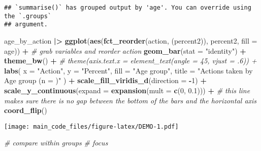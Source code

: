 \documentclass[
]{article}
\newenvironment{Shaded}{\begin{snugshade}}{\end{snugshade}}
\newcommand{\AttributeTok}[1]{\textcolor[rgb]{0.13,0.29,0.53}{#1}}
\newcommand{\CommentTok}[1]{\textcolor[rgb]{0.56,0.35,0.01}{\textit{#1}}}
\newcommand{\DecValTok}[1]{\textcolor[rgb]{0.00,0.00,0.81}{#1}}
\newcommand{\FloatTok}[1]{\textcolor[rgb]{0.00,0.00,0.81}{#1}}
\newcommand{\FunctionTok}[1]{\textcolor[rgb]{0.13,0.29,0.53}{\textbf{#1}}}
\newcommand{\NormalTok}[1]{#1}
\newcommand{\SpecialCharTok}[1]{\textcolor[rgb]{0.81,0.36,0.00}{\textbf{#1}}}
\newcommand{\StringTok}[1]{\textcolor[rgb]{0.31,0.60,0.02}{#1}}
\begin{document}
\begin{verbatim}
## `summarise()` has grouped output by 'age'. You can override using the `.groups`
## argument.
\end{verbatim}

\begin{Shaded}
\begin{Highlighting}[]
\NormalTok{age\_by\_action }\SpecialCharTok{|\textgreater{}}
  \FunctionTok{ggplot}\NormalTok{(}\FunctionTok{aes}\NormalTok{(}\FunctionTok{fct\_reorder}\NormalTok{(action, (percent2)), percent2, }\AttributeTok{fill =}\NormalTok{ age)) }\SpecialCharTok{+} \CommentTok{\# grab variables and reorder action}
  \FunctionTok{geom\_bar}\NormalTok{(}\AttributeTok{stat =} \StringTok{"identity"}\NormalTok{)  }\SpecialCharTok{+}
  \FunctionTok{theme\_bw}\NormalTok{() }\SpecialCharTok{+}
  \CommentTok{\# theme(axis.text.x = element\_text(angle = 45, vjust = .6)) +}
  \FunctionTok{labs}\NormalTok{(}
    \AttributeTok{x =} \StringTok{"Action"}\NormalTok{,}
    \AttributeTok{y =} \StringTok{"Percent"}\NormalTok{,}
    \AttributeTok{fill =} \StringTok{"Age group"}\NormalTok{,}
    \AttributeTok{title =} \StringTok{"Actions taken by Age group (n = )"}
\NormalTok{  ) }\SpecialCharTok{+}
  \FunctionTok{scale\_fill\_viridis\_d}\NormalTok{(}\AttributeTok{direction =} \SpecialCharTok{{-}}\DecValTok{1}\NormalTok{) }\SpecialCharTok{+}
  \FunctionTok{scale\_y\_continuous}\NormalTok{(}\AttributeTok{expand =} \FunctionTok{expansion}\NormalTok{(}\AttributeTok{mult =} \FunctionTok{c}\NormalTok{(}\DecValTok{0}\NormalTok{, }\FloatTok{0.1}\NormalTok{))) }\SpecialCharTok{+} \CommentTok{\# this line makes sure there is no gap between the bottom of the bars and the horizontal axis }
  \FunctionTok{coord\_flip}\NormalTok{() }
\end{Highlighting}
\end{Shaded}

\texttt{[image: main\_code\_files/figure-latex/DEMO-1.pdf]}

\begin{Shaded}
\begin{Highlighting}[]
\CommentTok{\# compare within groups}
\CommentTok{\# focus }
\end{Highlighting}
\end{Shaded}
\end{document}
